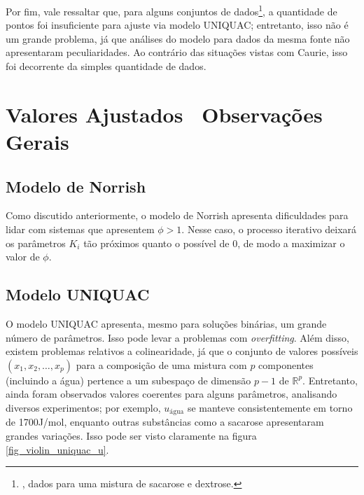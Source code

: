 \documentclass[
	12pt,				%
	openright,
	twoside,
	a4paper,			%
	english,			%
	french,				%
	spanish,			%
	brazil				%
	]{abntex2}
\begin{document}
Por fim, vale ressaltar que, para alguns conjuntos de dados\footnote{%
	\cite{norrish1966}, dados para uma mistura de sacarose e dextrose.
}, a quantidade de pontos foi insuficiente para ajuste via modelo UNIQUAC;
entretanto, isso não é um grande problema, já que análises do modelo para
dados da mesma fonte não apresentaram peculiaridades. Ao contrário das situações
vistas com Caurie, isso foi decorrente da simples quantidade de dados.



\section{Valores Ajustados \textendash\ Observações Gerais}

\subsection{Modelo de Norrish}

Como discutido anteriormente, o modelo de Norrish apresenta dificuldades para
lidar com sistemas que apresentem $\phi > 1$. Nesse caso, o processo iterativo
deixará os parâmetros $K_i$ tão próximos quanto o possível de 0, de modo a
maximizar o valor de $\phi$.

\subsection{Modelo UNIQUAC}

O modelo UNIQUAC apresenta, mesmo para soluções binárias, um grande número
de parâmetros. Isso pode levar a problemas com \textit{overfitting}. Além disso,
existem problemas relativos a colinearidade, já que o conjunto de valores
possíveis $(x_1,x_2,\ldots,x_p)$ para a composição de uma mistura com $p$
componentes (incluindo a água) pertence a um subespaço de dimensão $p-1$
de $\mathbb{R}^p$. Entretanto, ainda foram observados valores coerentes
para alguns parâmetros, analisando diversos experimentos; por exemplo,
$u_\text{água}$ se manteve consistentemente em torno de 1700J/mol, enquanto
outras substâncias como a sacarose apresentaram grandes variações. Isso
pode ser visto claramente na figura \ref{fig_violin_uniquac_u}.
\end{document}
